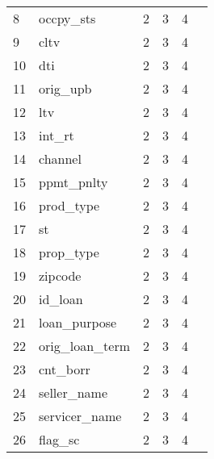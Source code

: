 \begin{center}
\begin{longtable}{@{}
>{\raggedright}p{.3cm}
p{6.5cm}
>{\raggedright}p{3cm}
>{\raggedright}p{1.5cm}p{1.5cm}@{}
p{1cm}
@{}}
\tiny 8 & \tiny occpy\_sts & \tiny 2 & \tiny  3 & \tiny 4 \\
\tiny 9 & \tiny cltv & \tiny 2 & \tiny  3  &\tiny  4\\ 
\tiny 10 &\tiny  dti & \tiny 2 & \tiny  3 & \tiny 4\\ 
\tiny 11 &\tiny  orig\_upb & \tiny 2 & \tiny  3  &\tiny  4\\
\tiny 12 &\tiny  ltv & \tiny 2 & \tiny  3 & \tiny 4 \\ 
\tiny 13 &\tiny  int\_rt & \tiny 2 & \tiny  3 & \tiny 4\\ 
\tiny 14 &\tiny  channel & \tiny 2 & \tiny  3 & \tiny 4 \\
\tiny 15 &\tiny  ppmt\_pnlty & \tiny 2 & \tiny  3  &\tiny  4\\ 
\tiny 16 &\tiny  prod\_type & \tiny 2 & \tiny  3 & \tiny 4\\ 
\tiny 17 &\tiny  st & \tiny 2 & \tiny  3  &\tiny  4\\
\tiny 18 &\tiny  prop\_type & \tiny 2 & \tiny  3 & \tiny 4 \\ 
\tiny 19 &\tiny  zipcode & \tiny 2 & \tiny  3 & \tiny 4\\ 
\tiny 20 &\tiny  id\_loan & \tiny 2 & \tiny  3 & \tiny 4 \\
\tiny 21 &\tiny  loan\_purpose & \tiny 2 & \tiny  3  &\tiny  4\\ 
\tiny 22 &\tiny  orig\_loan\_term & \tiny 2 & \tiny  3 & \tiny 4\\ 
\tiny 23 &\tiny  cnt\_borr & \tiny 2 & \tiny  3  &\tiny  4\\
\tiny 24 &\tiny  seller\_name & \tiny 2 & \tiny  3  &\tiny  4\\ 
\tiny 25 &\tiny  servicer\_name & \tiny 2 & \tiny  3 & \tiny 4\\ 
\tiny 26 &\tiny  flag\_sc & \tiny 2 & \tiny  3  &\tiny  4\\
\end{longtable}
\end{center}

